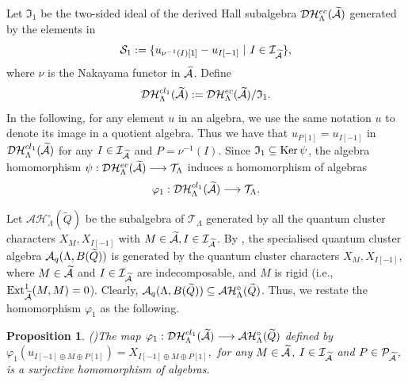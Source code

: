 \documentclass[reqno,12pt]{amsart}
\numberwithin{equation}{section}
\def\Ext{\mbox{\rm Ext}} \def\Hom{\mbox{\rm Hom}} \def\dim{\mbox{\rm dim}} \def\Iso{\mbox{\rm Iso}\,}\def\Ind{\mbox{\rm Ind}\,}
\def\Ker{\mbox{\rm Ker}\,}   \def\im{\mbox{\rm Im}\,} \def\Coker{\mbox{\rm Coker}\,}
\def\P{\mathcal{P}}\def\I{\mathcal{I}}\def\X{\mathbb X}\def\T{\mathbb T}\def\e{\mbox{\rm e}}
\theoremstyle{plain} %
\newtheorem{proposition}[theorem]{\bf Proposition}
\theoremstyle{definition} %
\begin{document}
Let $\mathfrak{I}_1$ be the two-sided ideal of the derived Hall subalgebra $\mathcal {D}\mathcal {H}_\Lambda^{ec}(\widetilde{\mathcal{A}})$ generated by the elements in $$\mathcal {S}_1:=\{u_{\nu^{-1}(I)[1]}-u_{I[-1]}~|~I\in\I_{\widetilde{\A}}\},$$
where $\nu$ is the Nakayama functor in $\widetilde{\mathcal{A}}$.
Define \begin{equation}\mathcal {D}\mathcal {H}_\Lambda^{{cl}_1}(\widetilde{\mathcal{A}}):=\mathcal {D}\mathcal {H}_\Lambda^{ec}(\widetilde{\mathcal{A}})/\mathfrak{I}_1.\end{equation} In the following, for any element $u$ in an algebra, we use the same notation $u$ to denote its image in a quotient algebra. Thus we have that $u_{P[1]}=u_{I[-1]}$ in $\mathcal {D}\mathcal {H}_\Lambda^{{cl}_1}(\widetilde{\mathcal{A}})$ for any $I\in\I_{\widetilde{\A}}$ and $P=\nu^{-1}(I)$.
Since $\mathfrak{I}_1\subseteq\Ker \psi$, the algebra homomorphism $\psi:\mathcal {D}\mathcal {H}_\Lambda^{ec}(\widetilde{\mathcal{A}})\longrightarrow\mathcal{T}_\Lambda$ induces a homomorphism of algebras \begin{equation}\label{xuyaomap}\varphi_1:\mathcal {D}\mathcal {H}_\Lambda^{{cl}_1}(\widetilde{\mathcal{A}})\longrightarrow\mathcal{T}_\Lambda.\end{equation}

Let $\mathcal{A}\mathcal{H}_\Lambda^{\circ}(\widetilde{Q})$ be the subalgebra of $\mathcal{T}_\Lambda$ generated by all the quantum cluster characters $X_M, X_{I[-1]}$ with $M\in\widetilde{\A}, I\in\I_{\widetilde{\A}}$. By \cite{Rupel2}, the specialised quantum cluster algebra $\mathcal{A}_q(\Lambda, B(\widetilde{Q}))$ is generated by the quantum cluster characters $X_{M}, X_{I[-1]}$, where $M\in \widetilde{\mathcal{A}}$ and $I\in \mathcal{I}_{\widetilde{\mathcal{A}}}$ are indecomposable, and $M$ is rigid (i.e., $\Ext^1_{\widetilde{\A}}(M,M)=0$). Clearly, $\mathcal{A}_q(\Lambda, B(\widetilde{Q}))\subseteq \mathcal{A}\mathcal{H}_\Lambda^{\circ}(\widetilde{Q})$. Thus, we restate the homomorphism $\varphi_1$ as the following.




\begin{proposition}\textup{(\cite[Proposition 5.4]{CDZ})}\label{morphism1}
The map $\varphi_1:\mathcal {D}\mathcal {H}_\Lambda^{{cl}_1}(\widetilde{\mathcal{A}})\longrightarrow\mathcal{A}\mathcal{H}_\Lambda^{\circ}(\widetilde{Q})$ defined by
$\varphi_1(u_{I[-1]\oplus M\oplus P[1]})=X_{I[-1]\oplus M\oplus P[1]},$ for any $M\in\widetilde{\mathcal{A}}$, $I\in\I_{\widetilde{\A}}$ and $P\in\P_{\widetilde{\A}}$, is a surjective homomorphism of algebras.
\end{proposition}
\end{document}
